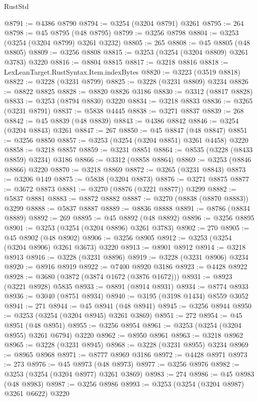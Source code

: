 \begin{lexlean}{RustStd}
\begin{coremodule}
@8791 := @4386 @8790
@8794 := @3254 (@3204 @8791) @3261
@8795 := 264
@8798 := @45 @8795 (@48 @8795)
@8799 := @3256 @8798
@8804 := @3253 (@3254 (@3204 @8799) @3261 @3232)
@8805 := 265
@8808 := @45 @8805 (@48 @8805)
@8809 := @3256 @8808
@8815 := @3253 (@3254 (@3204 @8809) @3261 @3783) @3220
@8816 := @8804 @8815
@8817 := @3218 @8816
@8818 := LexLeanTarget.RustSyntax.Item.indexBytes
@8820 := @3223 (@3519 @8818)
@8822 := @3228 (@3231 @8799)
@8825 := @3228 (@3231 @8809) @3234
@8826 := @8822 @8825
@8828 := @8820 @8826 @3186
@8830 := @3312 (@8817 @8828)
@8833 := @3253 (@8794 @8830) @3220
@8834 := @3218 @8833
@8836 := @3265 (@3231 @8791)
@8837 := @5838 @4445
@8838 := @3271 @8837
@8839 := 268
@8842 := @45 @8839 (@48 @8839)
@8843 := @4386 @8842
@8846 := @3254 (@3204 @8843) @3261
@8847 := 267
@8850 := @45 @8847 (@48 @8847)
@8851 := @3256 @8850
@8857 := @3253 (@3254 (@3204 @8851) @3261 @4458) @3220
@8858 := @3218 @8857
@8859 := @3231 @8851
@8864 := @8535 (@3228 (@8433 @8859) @3234) @3186
@8866 := @3312 (@8858 @8864)
@8869 := @3253 (@8846 @8866) @3220
@8870 := @3218 @8869
@8872 := @3265 (@3231 @8843)
@8873 := @3206 @149
@8875 := @5838 (@3204 @8873)
@8876 := @3271 @8875
@8877 := @3672 @8873
@8881 := @3270 (@8876 (@3221 @8877)) @3299
@8882 := @5837 @8881
@8883 := @8872 @8882
@8887 := @3270 (@8838 (@8870 @8883)) @3299
@8888 := @5837 @8887
@8889 := @8836 @8888
@8891 := @8786 (@8834 @8889)
@8892 := 269
@8895 := @45 @8892 (@48 @8892)
@8896 := @3256 @8895
@8901 := @3253 (@3254 (@3204 @8896) @3261 @3783)
@8902 := 270
@8905 := @45 @8902 (@48 @8902)
@8906 := @3256 @8905
@8912 := @3253 (@3254 (@3204 @8906) @3261 @3673) @3220
@8913 := @8901 @8912
@8914 := @3218 @8913
@8916 := @3228 (@3231 @8896)
@8919 := @3228 (@3231 @8906) @3234
@8920 := @8916 @8919
@8922 := @7400 @8920 @3186
@8923 := @4428 @8922
@8928 := @3680 (@3872 (@3874 @1672 (@3876 @1672)))
@8931 := @8923 (@3221 @8928) @5835
@8933 := @8891 (@8914 @8931)
@8934 := @8774 @8933
@8936 := @3040 (@8751 @8934)
@8940 := @3195 (@3198 @1434) @8559 @3052
@8941 := 271
@8944 := @45 @8941 (@48 @8941)
@8945 := @3256 @8944
@8950 := @3253 (@3254 (@3204 @8945) @3261 @3869)
@8951 := 272
@8954 := @45 @8951 (@48 @8951)
@8955 := @3256 @8954
@8961 := @3253 (@3254 (@3204 @8955) @3261 @6794) @3220
@8962 := @8950 @8961
@8963 := @3218 @8962
@8965 := @3228 (@3231 @8945)
@8968 := @3228 (@3231 @8955) @3234
@8969 := @8965 @8968
@8971 := @8777 @8969 @3186
@8972 := @4428 @8971
@8973 := 273
@8976 := @45 @8973 (@48 @8973)
@8977 := @3256 @8976
@8982 := @3253 (@3254 (@3204 @8977) @3261 @3869)
@8983 := 274
@8986 := @45 @8983 (@48 @8983)
@8987 := @3256 @8986
@8993 := @3253 (@3254 (@3204 @8987) @3261 @6622) @3220

\end{coremodule}
\end{lexlean}
